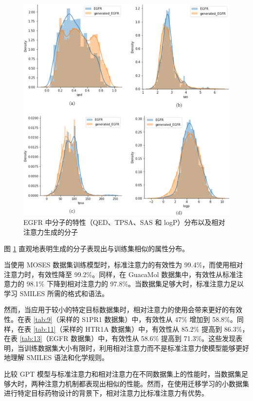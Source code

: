 \begin{translation}
\begin{figure}[H]
  \centering
  \includegraphics[width=\linewidth]{figures/9.png}
  \caption{EGFR 中分子的特性（QED、TPSA、SAS 和 logP）分布以及相对注意力生成的分子}
  \label{fig:9}
\end{figure}

图 \ref{fig:9} 直观地表明生成的分子表现出与训练集相似的属性分布。

当使用 MOSES 数据集训练模型时，标准注意力的有效性为 99.4\%，而使用相对注意力时，有效性降至 99.2\%。同样，在 GuacaMol 数据集中，有效性从标准注意力的 98.1\% 下降到相对注意力的 97.8\%。当数据集足够大时，标准注意力足以学习 SMILES 所需的格式和语法。

然而，当应用于较小的特定目标数据集时，相对注意力的使用会带来更好的有效性。在表 \ref{tab:9}（采样的 S1PR1 数据集）中，有效性从 47\% 增加到 58.8\%。同样，在表 \ref{tab:11}（采样的 HTR1A 数据集）中，有效性从 85.2\% 提高到 86.3\%，在表 \ref{tab:13}（EGFR 数据集）中，有效性从 58.6\% 提高到 71.3\%。这些发现表明，当训练数据集大小有限时，利用相对注意力而不是标准注意力使模型能够更好地理解 SMILES 语法和化学规则。

比较 GPT 模型与标准注意力和相对注意力在不同数据集上的性能时，当数据集足够大时，两种注意力机制都表现出相似的性能。然而，在使用迁移学习的小数据集进行特定目标药物设计的背景下，相对注意力比标准注意力有优势。


\end{translation}
